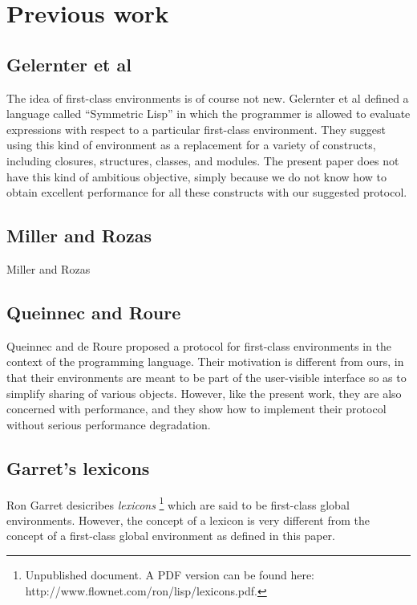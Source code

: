 \section{Previous work}

\subsection{Gelernter et al}

The idea of first-class environments is of course not new.
Gelernter et al \cite{Gelernter:1987:EFC:41625.41634} defined a
language called ``Symmetric Lisp'' in which the programmer is allowed
to evaluate expressions with respect to a particular first-class
environment.  They suggest using this kind of environment as a
replacement for a variety of constructs, including closures,
structures, classes, and modules.  The present paper does not have
this kind of ambitious objective, simply because we do not know how to
obtain excellent performance for all these constructs with our
suggested protocol.

\subsection{Miller and Rozas}

Miller and Rozas \cite{Miller:1991:FVF:113825.113826}

\subsection{Queinnec and Roure}

Queinnec and de Roure \cite{Queinnec:1996:SCT:232627.232653} proposed
a protocol for first-class environments in the context of the
\scheme{} programming language.  Their motivation is different from
ours, in that their environments are meant to be part of the
user-visible interface so as to simplify sharing of various objects.
However, like the present work, they are also concerned with
performance, and they show how to implement their protocol without
serious performance degradation.

\subsection{Garret's lexicons}

Ron Garret desicribes \emph{lexicons}%
\footnote{Unpublished document.  A PDF version can be found here:
  http://www.flownet.com/ron/lisp/lexicons.pdf.}
which are said to be first-class global environments.  However, the
concept of a lexicon is very different from the concept of a
first-class global environment as defined in this paper.


